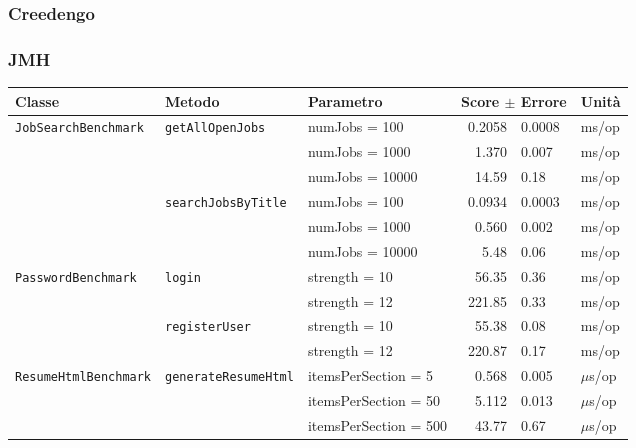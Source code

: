 \documentclass[12pt,a4paper]{article}
\begin{document}
    \subsubsection{Creedengo}




    \subsubsection{JMH}
    \begin{table}[H]
        \centering
        \small
        \begin{tabular}{lll r@{\,$\pm$\,}l l}
            \toprule
            \textbf{Classe} & \textbf{Metodo} & \textbf{Parametro} & \multicolumn{2}{c}{\textbf{Score $\pm$ Errore}} & \textbf{Unità} \\
            \midrule
            \texttt{JobSearchBenchmark} & \texttt{getAllOpenJobs} & numJobs = 100   & 0.2058 & 0.0008 & ms/op \\
            &                         & numJobs = 1000  & 1.370  & 0.007  & ms/op \\
            &                         & numJobs = 10000 & 14.59  & 0.18   & ms/op \\
            \cmidrule{2-6}
            & \texttt{searchJobsByTitle} & numJobs = 100   & 0.0934 & 0.0003 & ms/op \\
            &                            & numJobs = 1000  & 0.560  & 0.002  & ms/op \\
            &                            & numJobs = 10000 & 5.48   & 0.06   & ms/op \\
            \midrule
            \texttt{PasswordBenchmark}  & \texttt{login}        & strength = 10 & 56.35  & 0.36 & ms/op \\
            &                       & strength = 12 & 221.85 & 0.33 & ms/op \\
            \cmidrule{2-6}
            & \texttt{registerUser} & strength = 10 & 55.38  & 0.08 & ms/op \\
            &                       & strength = 12 & 220.87 & 0.17 & ms/op \\
            \midrule
            \texttt{ResumeHtmlBenchmark} & \texttt{generateResumeHtml} & itemsPerSection = 5   & 0.568 & 0.005 & $\mu$s/op \\
            &                             & itemsPerSection = 50  & 5.112 & 0.013 & $\mu$s/op \\
            &                             & itemsPerSection = 500 & 43.77 & 0.67  & $\mu$s/op \\

\end{tabular}
\end{table}
\end{document}

